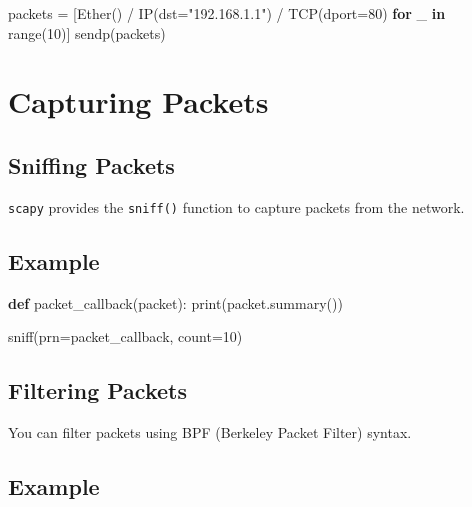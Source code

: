 \documentclass[
  letterpaper,
  DIV=11,
  numbers=noendperiod]{scrreprt}
\newenvironment{Shaded}{\begin{snugshade}}{\end{snugshade}}
\newcommand{\BuiltInTok}[1]{\textcolor[rgb]{0.00,0.23,0.31}{#1}}
\newcommand{\ControlFlowTok}[1]{\textcolor[rgb]{0.00,0.23,0.31}{\textbf{#1}}}
\newcommand{\DecValTok}[1]{\textcolor[rgb]{0.68,0.00,0.00}{#1}}
\newcommand{\KeywordTok}[1]{\textcolor[rgb]{0.00,0.23,0.31}{\textbf{#1}}}
\newcommand{\NormalTok}[1]{\textcolor[rgb]{0.00,0.23,0.31}{#1}}
\newcommand{\OperatorTok}[1]{\textcolor[rgb]{0.37,0.37,0.37}{#1}}
\newcommand{\StringTok}[1]{\textcolor[rgb]{0.13,0.47,0.30}{#1}}
\begin{document}
\begin{Shaded}
\begin{Highlighting}[]
\NormalTok{packets }\OperatorTok{=}\NormalTok{ [Ether() }\OperatorTok{/}\NormalTok{ IP(dst}\OperatorTok{=}\StringTok{"192.168.1.1"}\NormalTok{) }\OperatorTok{/}\NormalTok{ TCP(dport}\OperatorTok{=}\DecValTok{80}\NormalTok{) }\ControlFlowTok{for}\NormalTok{ \_ }\KeywordTok{in} \BuiltInTok{range}\NormalTok{(}\DecValTok{10}\NormalTok{)]}
\NormalTok{sendp(packets)}
\end{Highlighting}
\end{Shaded}

\section{Capturing Packets}\label{capturing-packets}

\subsection{Sniffing Packets}\label{sniffing-packets}

\texttt{scapy} provides the \texttt{sniff()} function to capture packets
from the network.

\subsection{Example}\label{example-63}

\begin{Shaded}
\begin{Highlighting}[]
\KeywordTok{def}\NormalTok{ packet\_callback(packet):}
    \BuiltInTok{print}\NormalTok{(packet.summary())}

\NormalTok{sniff(prn}\OperatorTok{=}\NormalTok{packet\_callback, count}\OperatorTok{=}\DecValTok{10}\NormalTok{)}
\end{Highlighting}
\end{Shaded}

\subsection{Filtering Packets}\label{filtering-packets}

You can filter packets using BPF (Berkeley Packet Filter) syntax.

\subsection{Example}\label{example-64}
\end{document}
